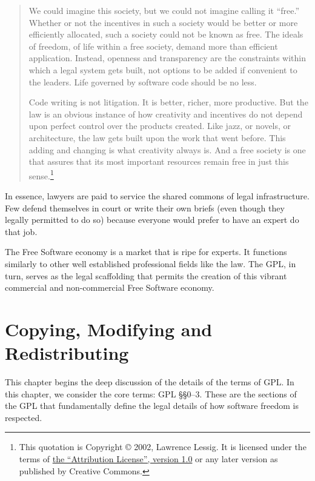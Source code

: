 \documentclass[12pt]{report}
\begin{document}
\begin{quotation}
We could imagine this society, but we could not imagine calling it
``free.''  Whether or not the incentives in such a society would be better
or more efficiently allocated, such a society could not be known as free.
The ideals of freedom, of life within a free society, demand more than
efficient application.  Instead, openness and transparency are the
constraints within which a legal system gets built, not options to be
added if convenient to the leaders.  Life governed by software code should
be no less.

Code writing is not litigation.  It is better, richer, more
productive. But the law is an obvious instance of how creativity and
incentives do not depend upon perfect control over the products created.
Like jazz, or novels, or architecture, the law gets built upon the work
that went before. This adding and changing is what creativity always is.
And a free society is one that assures that its most important resources
remain free in just this sense.\footnote{This quotation is Copyright
  \copyright{} 2002, Lawrence Lessig.  It is licensed under the terms of
  \href{http://creativecommons.org/licenses/by/1.0/}{the ``Attribution
    License'', version 1.0} or any later version as published by Creative
  Commons.}
\end{quotation}

In essence, lawyers are paid to service the shared commons of legal
infrastructure.  Few defend themselves in court or write their own briefs
(even though they legally permitted to do so) because everyone would
prefer to have an expert do that job.

The Free Software economy is a market that is ripe for experts.  It
functions similarly to other well established professional fields like the
law.  The GPL, in turn, serves as the legal scaffolding that permits the
creation of this vibrant commercial and non-commercial Free Software
economy.

\chapter{Copying, Modifying and Redistributing}

This chapter begins the deep discussion of the details of the terms of
GPL\@.  In this chapter, we consider the core terms: GPL \S\S 0--3.  These
are the sections of the GPL that fundamentally define the legal details of
how software freedom is respected.
\end{document}
